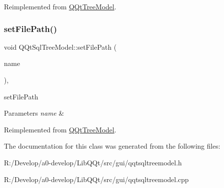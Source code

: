 Reimplemented from \mbox{\hyperlink{class_q_qt_tree_model_aacd492ce920be939d95d7e1bc2978cb1}{Q\+Qt\+Tree\+Model}}.

\mbox{\label{class_q_qt_sql_tree_model_ac1e2c11eda3698560b9e794a8d37c9fc}} 
\subsubsection{\texorpdfstring{set\+File\+Path()}{setFilePath()}}
{\footnotesize\ttfamily void Q\+Qt\+Sql\+Tree\+Model\+::set\+File\+Path (\begin{DoxyParamCaption}\item[{Q\+String}]{name }\end{DoxyParamCaption})\hspace{0.3cm}{\ttfamily [override]}, {\ttfamily [virtual]}}



set\+File\+Path 


\begin{DoxyParams}{Parameters}
{\em name} & \\
\hline
\end{DoxyParams}


Reimplemented from \mbox{\hyperlink{class_q_qt_tree_model_acfeea0d58fa29b1c34c1491f6a8f0b7c}{Q\+Qt\+Tree\+Model}}.



The documentation for this class was generated from the following files\+:\begin{DoxyCompactItemize}
\item 
R\+:/\+Develop/a0-\/develop/\+Lib\+Q\+Qt/src/gui/qqtsqltreemodel.\+h\item 
R\+:/\+Develop/a0-\/develop/\+Lib\+Q\+Qt/src/gui/qqtsqltreemodel.\+cpp\end{DoxyCompactItemize}
